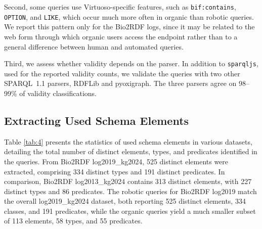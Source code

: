 \documentclass[sw]{iosart2x}
\begin{document}
Second, some queries use Virtuoso-specific features, such as \texttt{bif:contains}, \texttt{OPTION}, and \texttt{LIKE}, which occur much more often in organic than robotic queries. We report this pattern only for the Bio2RDF logs, since it may be related to the web form through which organic users access the endpoint rather than to a general difference between human and automated queries.

Third, we assess whether validity depends on the parser. In addition to \texttt{sparqljs}, used for the reported validity counts, we validate the queries with two other SPARQL~1.1 parsers, RDFLib and pyoxigraph. The three parsers agree on 98--99\% of validity classifications.

\subsection{Extracting Used Schema Elements} 
Table \ref{tab:4} presents the statistics of used schema elements in various datasets, detailing the total number of distinct elements, types, and predicates identified in the queries. From Bio2RDF log2019\_kg2024, 525 distinct elements were extracted, comprising 334 distinct types and 191 distinct predicates. In comparison, Bio2RDF log2013\_kg2024 contains 313 distinct elements, with 227 distinct types and 86 predicates. The robotic queries for Bio2RDF log2019 match the overall log2019\_kg2024 dataset, both reporting 525 distinct elements, 334 classes, and 191 predicates, while the organic queries yield a much smaller subset of 113 elements, 58 types, and 55 predicates.
\end{document}
